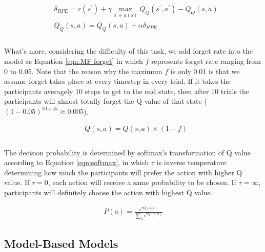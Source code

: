 \begin{equation}
\begin{aligned}
&\delta_{RPE}=r(s^{\prime})+\gamma \max_{a^{\prime} \in a(s)}{Q_{Q}(s^{\prime}, a^{\prime})}- Q_{Q}(s,a) \\
&Q_Q(s,a)=Q_Q(s,a)+\alpha \delta_{RPE} \\
\end{aligned}
\label{eqn:Q-Learning}
\end{equation}

\paragraph{}
What's more, considering the difficulty of this task, we add forget rate into the model as Equation \ref{eqn:MF forget} in which $f$ represents forget rate ranging from 0 to 0.05. Note that the reason why the maximum $f$ is only 0.01 is that we assume forget takes place at every timestep in every trial. If it takes the participants averagely 10 steps to get to the end state, then after 10 trials the participants will almost totally forget the Q value of that state ($(1-0.05)^{10 \times 45} \approx 0.005$). 

\begin{equation}
\begin{aligned}
&Q(s,a)=Q(s,a) \times (1 - f) \\
\end{aligned}
\label{eqn:MF forget}
\end{equation}

\paragraph{}
The decision probability is determined by softmax's transformation of Q value according to Equation \ref{eqn:softmax}, in which $\tau$ is inverse temperature determining how much the participants will prefer the action with higher Q value. If $\tau = 0$, each action will receive a same probability to be chosen. If $\tau = \infty$, participants will definitely choose the action with highest Q value. 

\begin{equation}
\begin{aligned}
P(a)=\frac{e^{\tau Q(s,a)}}{\sum_a{e^{\tau Q(s,a)}}}
\end{aligned}
\label{eqn:softmax}
\end{equation} 


\subsection{Model-Based Models}

